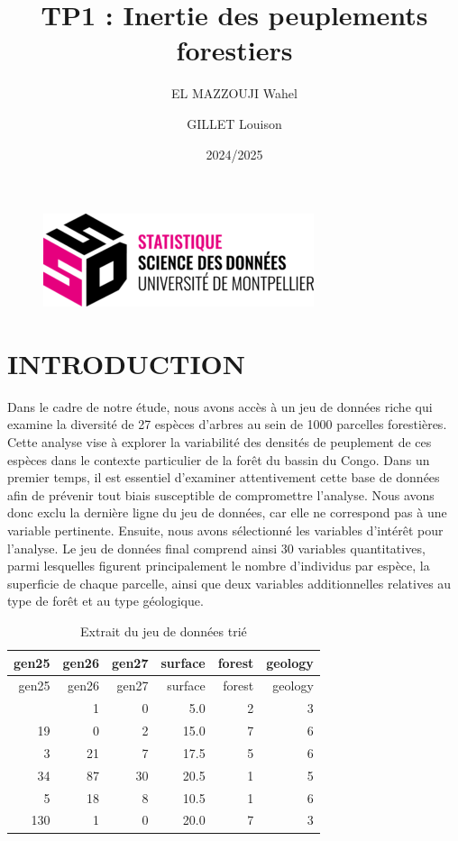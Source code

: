 \documentclass[
]{article}
\title{TP1 : Inertie des peuplements forestiers}
\author{EL MAZZOUJI Wahel \and GILLET Louison}
\date{2024/2025}
\begin{document}
\maketitle

\begin{figure}[h!]
    \centering
    \includegraphics[width=0.5\linewidth]{ssd.png}
\end{figure}

\newpage

\tableofcontents

\newpage

\hypertarget{introduction}{%
\section{INTRODUCTION}\label{introduction}}

Dans le cadre de notre étude, nous avons accès à un jeu de données riche
qui examine la diversité de 27 espèces d'arbres au sein de 1000
parcelles forestières. Cette analyse vise à explorer la variabilité des
densités de peuplement de ces espèces dans le contexte particulier de la
forêt du bassin du Congo. Dans un premier temps, il est essentiel
d'examiner attentivement cette base de données afin de prévenir tout
biais susceptible de compromettre l'analyse. Nous avons donc exclu la
dernière ligne du jeu de données, car elle ne correspond pas à une
variable pertinente. Ensuite, nous avons sélectionné les variables
d'intérêt pour l'analyse. Le jeu de données final comprend ainsi 30
variables quantitatives, parmi lesquelles figurent principalement le
nombre d'individus par espèce, la superficie de chaque parcelle, ainsi
que deux variables additionnelles relatives au type de forêt et au type
géologique.

\begin{longtable}[]{@{}rrrrrr@{}}
\caption{Extrait du jeu de données trié}\tabularnewline
\toprule\noalign{}
gen25 & gen26 & gen27 & surface & forest & geology \\
\midrule\noalign{}
\endfirsthead
\toprule\noalign{}
gen25 & gen26 & gen27 & surface & forest & geology \\
\midrule\noalign{}
\endhead
\bottomrule\noalign{}
\endlastfoot
32 & 1 & 0 & 5.0 & 2 & 3 \\
19 & 0 & 2 & 15.0 & 7 & 6 \\
3 & 21 & 7 & 17.5 & 5 & 6 \\
34 & 87 & 30 & 20.5 & 1 & 5 \\
5 & 18 & 8 & 10.5 & 1 & 6 \\
130 & 1 & 0 & 20.0 & 7 & 3 \\
\end{longtable}
\end{document}
